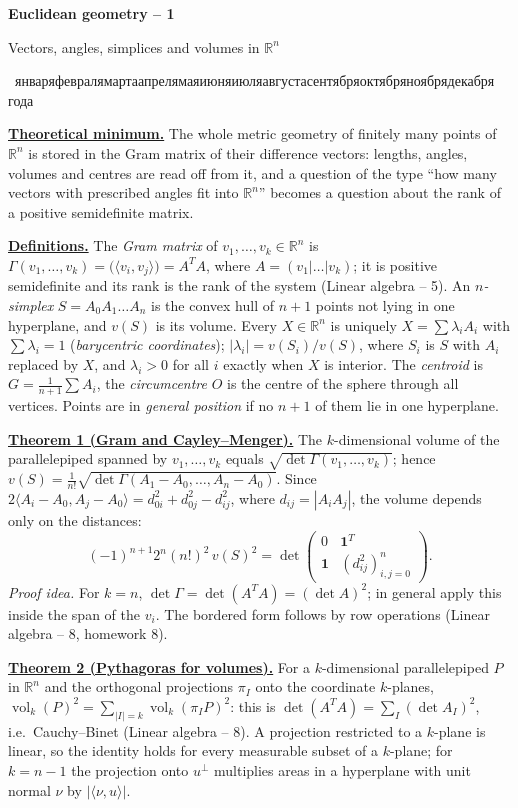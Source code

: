 \documentclass[11pt,a4paper]{article}
\newcommand{\head}[1]{\par\medskip\noindent\textbf{\underline{#1}}\quad}
\newcommand{\sheettitle}[3]{%
  \begin{center}
  {\huge\bfseries #1\par}\vspace{1.2em}
  {\Large #2\par}\vspace{0.8em}
  \if\relax\detokenize{#3}\relax\else{\Large #3\par}\vspace{0.8em}\fi
  {\foreignlanguage{russian}{\rudate}\par}
  \end{center}\vspace{0.5em}}
\newcommand{\rudate}{\number\day~\ifcase\month\or января\or февраля\or марта\or апреля\or мая\or июня\or июля\or августа\or сентября\or октября\or ноября\or декабря\fi~\number\year~года}
\begin{document}
\setlength{\emergencystretch}{2em}
\sheettitle{Euclidean geometry -- 1}{Vectors, angles, simplices and volumes in $\mathbb{R}^n$}{}

\head{Theoretical minimum.} The whole metric geometry of finitely many points of
$\mathbb{R}^n$ is stored in the Gram matrix of their difference vectors: lengths,
angles, volumes and centres are read off from it, and a question of the type
``how many vectors with prescribed angles fit into $\mathbb{R}^n$'' becomes a question
about the rank of a positive semidefinite matrix.

\head{Definitions.} The \emph{Gram matrix} of $v_1,\dots,v_k\in\mathbb{R}^n$ is
$\Gamma(v_1,\dots,v_k)=\bigl(\langle v_i,v_j\rangle\bigr)=A^TA$, where
$A=(v_1|\dots|v_k)$; it is positive semidefinite and its rank is the rank of the
system (Linear algebra -- 5). An \emph{$n$-simplex} $S=A_0A_1\dots A_n$ is the convex
hull of $n+1$ points not lying in one hyperplane, and $v(S)$ is its volume. Every
$X\in\mathbb{R}^n$ is uniquely $X=\sum\lambda_iA_i$ with $\sum\lambda_i=1$
(\emph{barycentric coordinates}); $|\lambda_i|=v(S_i)/v(S)$, where $S_i$ is $S$ with
$A_i$ replaced by $X$, and $\lambda_i>0$ for all $i$ exactly when $X$ is interior. The
\emph{centroid} is $G=\frac1{n+1}\sum A_i$, the \emph{circumcentre} $O$ is the centre
of the sphere through all vertices. Points are in \emph{general position} if no
$n+1$ of them lie in one hyperplane.

\head{Theorem 1 (Gram and Cayley--Menger).} The $k$-dimensional volume of the
parallelepiped spanned by $v_1,\dots,v_k$ equals $\sqrt{\det\Gamma(v_1,\dots,v_k)}$;
hence $v(S)=\frac1{n!}\sqrt{\det\Gamma(A_1-A_0,\dots,A_n-A_0)}$. Since
$2\langle A_i-A_0,A_j-A_0\rangle=d_{0i}^2+d_{0j}^2-d_{ij}^2$, where
$d_{ij}=|A_iA_j|$, the volume depends only on the distances:
\[
(-1)^{n+1}2^n(n!)^2\,v(S)^2=\det\begin{pmatrix}0&\mathbf 1^T\\ \mathbf 1&(d_{ij}^2)_{i,j=0}^n\end{pmatrix}.
\]
\emph{Proof idea.} For $k=n$, $\det\Gamma=\det(A^TA)=(\det A)^2$; in general apply
this inside the span of the $v_i$. The bordered form follows by row operations
(Linear algebra -- 8, homework 8).

\head{Theorem 2 (Pythagoras for volumes).} For a $k$-dimensional parallelepiped $P$
in $\mathbb{R}^n$ and the orthogonal projections $\pi_I$ onto the coordinate
$k$-planes, $\operatorname{vol}_k(P)^2=\sum_{|I|=k}\operatorname{vol}_k(\pi_IP)^2$:
this is $\det(A^TA)=\sum_I(\det A_I)^2$, i.e.\ Cauchy--Binet (Linear algebra -- 8).
A projection restricted to a $k$-plane is linear, so the identity holds for every
measurable subset of a $k$-plane; for $k=n-1$ the projection onto $u^\perp$
multiplies areas in a hyperplane with unit normal $\nu$ by $|\langle\nu,u\rangle|$.
\end{document}
